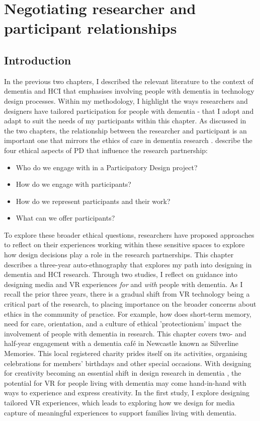 \chapter{Negotiating researcher and participant relationships}
\label{NegotatingReseacherParticipantRelationships}
\section{Introduction}
\label{Relationships:Introduction}
In the previous two chapters, I described the relevant literature to the context of dementia and HCI that emphasises involving people with dementia in technology design processes. Within my methodology, I highlight the ways researchers and designers have tailored participation for people with dementia - that I adopt and adapt to suit the needs of my participants within this chapter. As discussed in the two chapters, the relationship between the researcher and participant is an important one that mirrors the ethics of care in dementia research \cite{hamington_integrating_2019}. \cite{robertson2012ethics} describe the four ethical aspects of PD that influence the research partnership:
\begin{itemize}
\item Who do we engage with in a Participatory Design project?
\item How do we engage with participants?
\item How do we represent participants and their work?
\item What can we offer participants?
\end{itemize}

To explore these broader ethical questions, researchers have proposed approaches to reflect on their experiences working within these sensitive spaces to explore how design decisions play a role in the research partnerships. This chapter describes a three-year auto-ethnography that explores my path into designing in dementia and HCI research. Through two studies, I reflect on guidance into designing media and VR experiences \textit{for} and \textit{with} people with dementia. As I recall the prior three years, there is a gradual shift from VR technology being a critical part of the research, to placing importance on the broader concerns about ethics in the community of practice. For example, how does short-term memory, need for care, orientation, and a culture of ethical 'protectionism' impact the involvement of people with dementia in research. This chapter covers two- and half-year engagement with a dementia café in Newcastle known as Silverline Memories. This local registered charity prides itself on its activities, organising celebrations for members' birthdays and other special occasions. With designing for creativity becoming an essential shift in design research in dementia \citep{john_killick_claire_craig_creativity_2012,morrissey_creative_2015,wallace_design-led_2013}, the potential for VR for people living with dementia may come hand-in-hand with ways to experience and express creativity. In the first study, I explore designing tailored VR experiences, which leads to exploring how we design for media capture of meaningful experiences to support families living with dementia.

